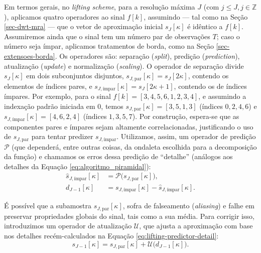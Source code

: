 Em termos gerais, no \emph{lifting scheme}, para a resolução máxima \(J\) (com \(j \leq J, j \in \mathbb{Z}\)), aplicamos quatro operadores ao sinal \(f[k]\), assumindo — tal como na Seção \ref{sec-dwt-mra} — que o vetor de aproximação inicial \(s_{J}[\kappa]\) é idêntico a \(f[k]\). 
Assumiremos ainda que o sinal tem um número par de observações \(T\); caso o número seja ímpar, aplicamos tratamentos de borda, como na Seção \ref{sec-extensoes-borda}. 
Os operadores são: separação (\emph{split}), predição (\emph{prediction}), atualização (\emph{update}) e normalização (\emph{scaling}). 
O operador de separação divide \(s_{J}[\kappa]\) em dois subconjuntos disjuntos, \(s_{J, \text{par}}[\kappa] = s_{J}[2\kappa]\), contendo os elementos de índices pares, e \(s_{J, \text{ímpar}}[\kappa] = s_{J}[2\kappa + 1]\), contendo os de índices ímpares. 
Por exemplo, para o sinal \(f[k] = [3,4,5,6,1,2,3,4]\), e assumindo a indexação padrão iniciada em 0, temos \(s_{J, \text{par}}[\kappa] = [3, 5, 1, 3]\) (índices \(0, 2, 4, 6\)) e \(s_{J, \text{ímpar}}[\kappa] = [4, 6, 2, 4]\) (índices \(1, 3, 5, 7\)). 
Por construção, espera-se que as componentes pares e ímpares sejam altamente correlacionadas, justificando o uso de \(s_{J, \text{par}}\) para tentar predizer \(s_{J, \text{ímpar}}\). 
Utilizamos, assim, um operador de predição \(\mathcal{P}\) (que dependerá, entre outras coisas, da ondaleta escolhida para a decomposição da função) e chamamos os erros dessa predição de ``detalhe'' (análogos aos detalhes da Equação \ref{eq:algoritmo_piramidal}):
\begin{equation}
\begin{aligned}
    \hat s_{J,\text{ímpar}}[\kappa] &= \mathcal{P}\!\big(s_{J, \text{par}}[\kappa]\big),\\
    d_{J-1}[\kappa] &= s_{J, \text{ímpar}}[\kappa] - \hat s_{J, \text{ímpar}}[\kappa].
\end{aligned}
\label{eq:lifting-predictor-detail}
\end{equation}

É possível que a subamostra \(s_{J, \text{par}}[\kappa]\), sofra de falseamento (\emph{aliasing}) e falhe em preservar propriedades globais do sinal, tais como a sua média. 
Para corrigir isso, introduzimos um operador de atualização \(\mathcal{U}\), que ajusta a aproximação com base nos detalhes recém-calculados na Equação \ref{eq:lifting-predictor-detail}:
\begin{equation}
    s_{J-1}[\kappa] = s_{J, \text{par}}[\kappa] + \mathcal{U}\!\big(d_{J-1}[\kappa]\big).
\end{equation}

